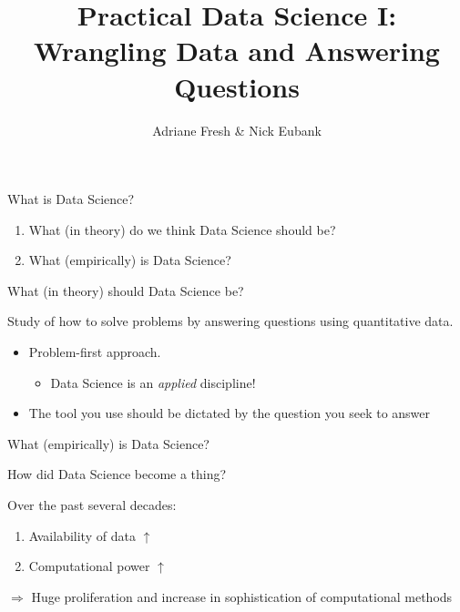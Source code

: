 \documentclass[11pt]{beamer}
\title{Practical Data Science I: \\ Wrangling Data and Answering Questions}
\author{\small Adriane Fresh \& Nick Eubank}
\date{\vspace*{.3in} \date}
\begin{document}
\begin{frame}
\maketitle
\end{frame}


\begin{frame}[c]{What is Data Science?}
\begin{enumerate}
	\pause \item What (\alert{in theory}) do we think Data Science should be?
	\pause \item What (\alert{empirically}) is Data Science?
\end{enumerate}
\end{frame}


\begin{frame}[c]{What (in theory) should Data Science be?}

\pause Study of how to \alert{solve problems} \pause by \alert{answering questions} \pause using \alert{quantitative data.}

\pause
\begin{itemize}
	\item Problem-first approach. 
	\begin{itemize}
		\pause \item Data Science is an \emph{applied} discipline!
	\end{itemize} 
	\pause \item The tool you use should be dictated by the question you seek to answer
\end{itemize}

\end{frame}


\begin{frame}[c]{What (empirically) is Data Science?}

\end{frame}

\begin{frame}[c]{How did Data Science become a thing?}

Over the past several decades:
\begin{enumerate}
	\item Availability of data $\uparrow$
	\item Computational power $\uparrow$
\end{enumerate}
\pause
$\Rightarrow$ Huge proliferation and increase in sophistication of computational methods
\end{frame}
\end{document}
